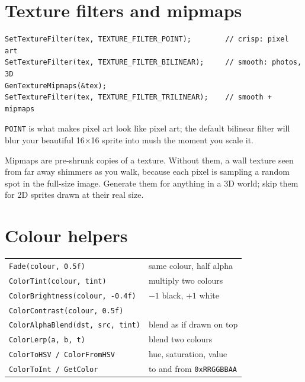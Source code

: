 
\section{Texture filters and mipmaps}

\begin{lstlisting}
SetTextureFilter(tex, TEXTURE_FILTER_POINT);        // crisp: pixel art
SetTextureFilter(tex, TEXTURE_FILTER_BILINEAR);     // smooth: photos, 3D
GenTextureMipmaps(&tex);
SetTextureFilter(tex, TEXTURE_FILTER_TRILINEAR);    // smooth + mipmaps
\end{lstlisting}

\lstinline|POINT| is what makes pixel art look like pixel art; the default
bilinear filter will blur your beautiful 16$\times$16 sprite into mush the moment
you scale it.

Mipmaps are pre-shrunk copies of a texture. Without them, a wall texture seen
from far away shimmers as you walk, because each pixel is sampling a random spot
in the full-size image. Generate them for anything in a 3D world; skip them for
2D sprites drawn at their real size.

\section{Colour helpers}

\begin{center}
\begin{tabular}{@{}ll@{}}
\toprule
\lstinline|Fade(colour, 0.5f)| & same colour, half alpha \\
\lstinline|ColorTint(colour, tint)| & multiply two colours \\
\lstinline|ColorBrightness(colour, -0.4f)| & $-1$ black, $+1$ white \\
\lstinline|ColorContrast(colour, 0.5f)| & \\
\lstinline|ColorAlphaBlend(dst, src, tint)| & blend as if drawn on top \\
\lstinline|ColorLerp(a, b, t)| & blend two colours \\
\lstinline|ColorToHSV / ColorFromHSV| & hue, saturation, value \\
\lstinline|ColorToInt / GetColor| & to and from \lstinline|0xRRGGBBAA| \\
\bottomrule
\end{tabular}
\end{center}

